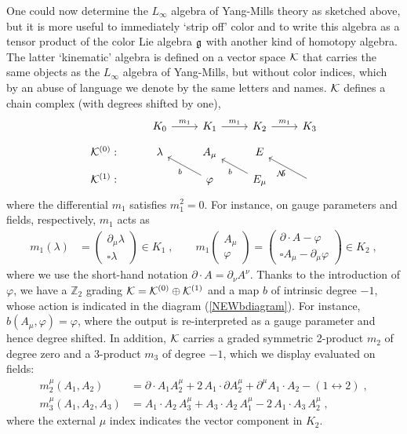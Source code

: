\documentclass[12pt]{article}\pdfoutput=1
\def\cK{{\cal K}}
\def\bpm{\begin{pmatrix}}
\def\epm{\end{pmatrix}}
\def\cN{{\cal N}}
\def\del{\partial}
\begin{document}
One could now determine the $L_{\infty}$ algebra of Yang-Mills theory as sketched above, but 
it is more useful to immediately `strip off' color and to write this algebra as a tensor product 
of the color Lie algebra $\frak{g}$ with another kind of homotopy algebra. 
The latter `kinematic' algebra is defined on a vector space ${\cal K}$ that carries the same objects 
as the $L_{\infty}$ algebra of Yang-Mills, but without  color indices, which by an abuse of language 
we denote by the same letters and names. ${\cal K}$ defines a chain complex 
(with degrees shifted by one), 
\begin{equation}\label{NEWbdiagram}
\begin{tikzcd}[row sep=2mm]
&K_{0}\arrow{r}{m_1} & K_{1}\arrow{r}{m_1} & K_2\arrow{r}{m_1} & K_3\\
\cK^{(0)}:&\lambda& A_\mu & E\\
\cK^{(1)}: & &\arrow{ul}{b}\varphi&\arrow{ul}{b}E_\mu &\arrow{ul}{b}\cN
\end{tikzcd} 
\end{equation}
where the differential $m_1$  satisfies  $m_1^2=0$. For instance, on gauge parameters and fields, respectively,  
$m_1$ acts as 
\begin{equation}\label{Qaction}
\begin{split}
m_1(\lambda)&=\bpm\del_\mu\lambda\\\square\lambda\epm\in K_{1}\;, \qquad 
m_1\bpm A_\mu\\\varphi\epm =\bpm\del\cdot A-\varphi\\\square A_\mu-\del_\mu\varphi\epm\in K_2\;,  
\end{split} 
\end{equation}
where we use the short-hand notation 
$\del\cdot A=\partial_{\nu} A^{\nu}$. 
Thanks to the introduction of $\varphi$, 
we have  a $\mathbb{Z}_2$ grading ${\cal K}=\cK^{(0)}\oplus \cK^{(1)}$ and a map $b$ of intrinsic degree $-1$, whose action is indicated 
in the diagram (\ref{NEWbdiagram}).  
For instance, $b(A_{\mu}, \varphi)=\varphi$, where the output is re-interpreted as a gauge parameter and hence degree shifted.   
In addition, ${\cal K}$ carries a graded symmetric 2-product $m_2$ of degree zero and a 3-product $m_3$ of degree $-1$, 
which we display evaluated on fields:  
\begin{equation}\label{m2andm3}
\begin{split}
m^\mu_2(A_1, A_2)&=\del\cdot A_1 A_2^\mu+2\,A_1\cdot\del A_2^\mu+\del^\mu A_1\cdot A_2 - (1\leftrightarrow2)\;,\\
m_3^\mu(A_1,A_2,A_3)&=A_1\cdot A_2\,A_3^\mu+A_3\cdot A_2\,A_1^\mu-2\,A_1\cdot A_3\,A_2^\mu\;,
\end{split}    
\end{equation}
where the external $\mu$ index indicates the vector component in $K_2$. 
\end{document}
